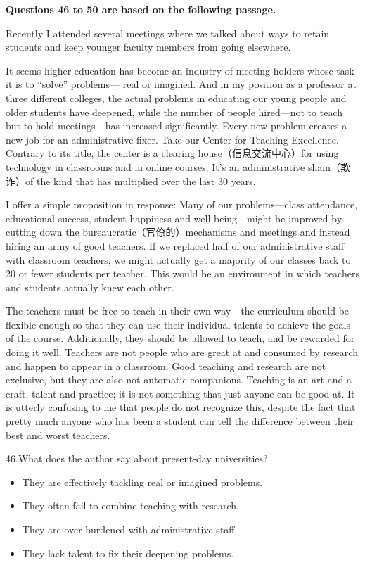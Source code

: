 \documentclass[UTF8,11pt]{ctexart}
\begin{document}
\textbf{Questions 46 to 50 are based on the following passage.}


Recently I attended several meetings where we talked about ways to retain students and keep younger faculty members from going elsewhere.


It seems higher education has become an industry of meeting-holders whose task it is to “solve” problems— real or imagined. And in my position as a professor at three different colleges, the actual problems in educating our young people and older students have deepened, while the number of people hired—not to teach but to hold meetings—has increased significantly. Every new problem creates a new job for an administrative fixer. Take our Center for Teaching Excellence. Contrary to its title, the center is a clearing house（信息交流中心）for using technology in classrooms and in online courses. It’s an administrative sham（欺诈）of the kind that has multiplied over the last 30 years.


I offer a simple proposition in response: Many of our problems—class attendance, educational success, student happiness and well-being—might be improved by cutting down the bureaucratic（官僚的）mechanisms and meetings and instead hiring an army of good teachers. If we replaced half of our administrative staff with classroom teachers, we might actually get a majority of our classes back to 20 or fewer students per teacher. This would be an environment in which teachers and students actually knew each other.


The teachers must be free to teach in their own way—the curriculum should be flexible enough so that they can use their individual talents to achieve the goals of the course. Additionally, they should be allowed to teach, and be rewarded for doing it well. Teachers are not people who are great at and consumed by research and happen to appear in a classroom. Good teaching and research are not exclusive, but they are also not automatic companions. Teaching is an art and a craft, talent and practice; it is not something that just anyone can be good at. It is utterly confusing to me that people do not recognize this, despite the fact that pretty much anyone who has been a student can tell the difference between their best and worst teachers.


46.What does the author say about present-day universities?


\begin{itemize}[leftmargin=2em,itemsep=.2em,topsep=.4em]\item[A.] They are effectively tackling real or imagined problems.
\item[B.] They often fail to combine teaching with research.
\item[C.] They are over-burdened with administrative staff.
\item[D.] They lack talent to fix their deepening problems.
\end{itemize}
\end{document}
